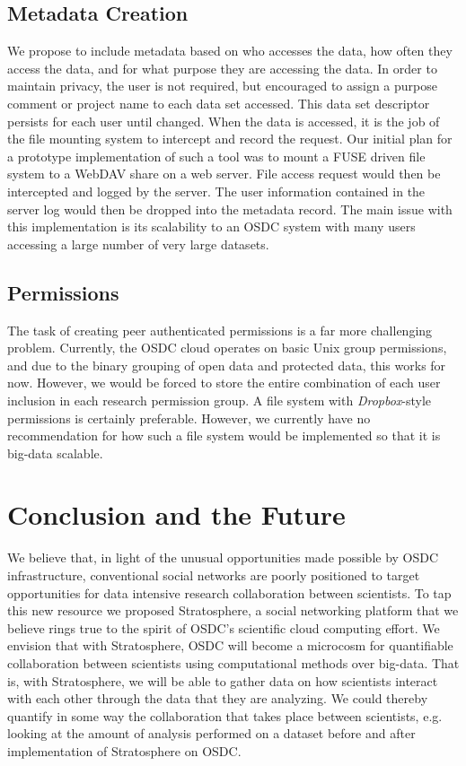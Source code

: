 \begin{multicols*}{2}
\subsection{Metadata Creation}

We propose to include metadata based on who accesses the data, how
often they access the data, and for what purpose they are accessing
the data.  In order to maintain privacy, the user is not required, but
encouraged to assign a purpose comment or project name to each data set
accessed. This data set descriptor persists for each user until
changed.  When the data is accessed, it is the job of the file
mounting system to intercept and record the request. Our initial plan
for a prototype implementation of such a tool  was to mount a FUSE driven file
system to a WebDAV share on a web server. File access request would
then be intercepted and logged by the server. The user information
contained in the server log would then be dropped into the metadata
record. The main issue with this implementation is its scalability to
an OSDC system with many users accessing a large number of very large
datasets.        

\subsection{Permissions}

The task of creating peer authenticated permissions is a far more
challenging problem. Currently, the OSDC cloud operates on basic Unix
group permissions, and due to the binary grouping of open data and
protected data, this works for now. However, we would be forced to
store the entire combination of each user inclusion in each research
permission group. A file system with \emph{Dropbox}-style
permissions is certainly preferable. However, we currently have no
recommendation for how such a file system would be implemented so that
it is big-data scalable.


\section{Conclusion and the Future}
\label{sec:conclusion}

We believe that, in light of the unusual opportunities made possible
by OSDC infrastructure, conventional social networks are poorly positioned
to target opportunities for data intensive research collaboration
between scientists. To tap this new resource we proposed Stratosphere, a social
networking platform that we believe rings true to the spirit of OSDC's
scientific cloud computing effort. We envision that with Stratosphere, 
OSDC will become a microcosm for quantifiable collaboration between
scientists using computational methods over big-data. That is, with
Stratosphere, we will be able to gather data on how scientists
interact with each other through the data that they are analyzing. We could
thereby quantify in some way the collaboration that takes place
between scientists, e.g. looking at the amount of analysis performed
on a dataset before and after implementation of Stratosphere on OSDC.  

\end{multicols*}

